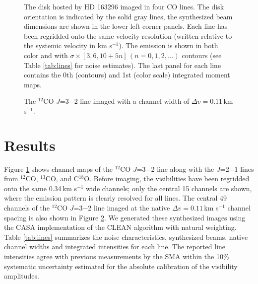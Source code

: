 \begin{figure}[t!]
\caption{The disk hosted by HD 163296 imaged in four CO lines. The 
disk orientation is indicated by the solid gray lines, the synthesized beam 
dimensions are shown in the lower left corner panels.  Each line has been 
regridded onto the same velocity resolution (written relative to the systemic 
velocity in km s$^{-1}$).  The emission is shown in both color and with 
$\sigma \times [3,6,10 + 5n]\,(n = 0,1,2,\ldots)$ contours (see Table 
\ref{tab:lines} for noise estimates).  The last panel for each line contains the
0th (contours) and 1st (color scale) integrated moment maps.
\label{fig:datachmaps}}
\end{figure}

\begin{figure}[t!]
\caption{The $^{12}$CO $J$=3$-$2 line imaged with a channel width of
$\Delta v = 0.11$\,km s$^{-1}$.  
\label{fig:CO32chmaps}}
\end{figure}

\section{Results}\label{sec:results}

Figure \ref{fig:datachmaps} shows channel maps of the $^{12}$CO $J$=3$-$2 line 
along with the $J$=2$-$1 lines from $^{12}$CO, $^{13}$CO, and C$^{18}$O.  
Before imaging, the visibilities have been regridded onto the same 
0.34\,km s$^{-1}$ wide channels; only the central 15 channels are shown, where 
the emission pattern is clearly resolved for all lines.  The central 49 channels
of the $^{12}$CO $J$=3$-$2 line imaged at the native 
$\Delta v=0.11$\,km s$^{-1}$ channel spacing is also shown in Figure 
\ref{fig:CO32chmaps}.  We generated these synthesized images using the CASA 
implementation of the CLEAN algorithm \citep{hogbom74} with natural weighting.  
Table \ref{tab:lines} summarizes the noise characteristics, synthesized beams, 
native channel widths and integrated intensities for each line.  The reported 
line intensities agree with previous measurements by the SMA \citep{qi11} 
within the 10\% systematic uncertainty estimated for the absolute calibration of
the visibility amplitudes.

